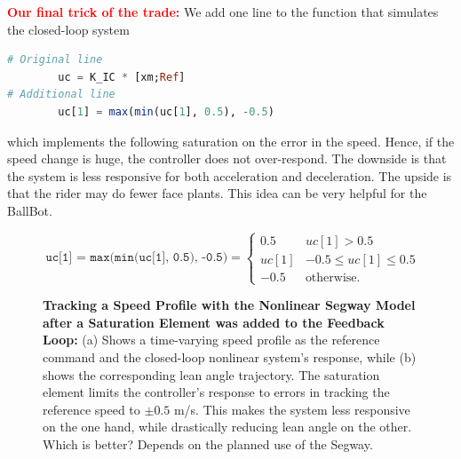 \bigskip
\textcolor{red}{\bf \Large Our final trick of the trade:} We add one line to the function that simulates the closed-loop system

\begin{lstlisting}[language=Julia,style=mystyle]
# Original line
        uc = K_IC * [xm;Ref]
# Additional line 
        uc[1] = max(min(uc[1], 0.5), -0.5)
\end{lstlisting}
which implements the following saturation on the error in the speed. Hence, if the speed change is huge, the controller does not over-respond. The downside is that the system is less responsive for both acceleration and deceleration. The upside is that the rider may do fewer face plants. This idea can be very helpful for the BallBot. 

$$
\texttt{ uc[1] = max(min(uc[1], 0.5), -0.5)}=\begin{cases}
0.5 & uc[1] > 0.5 \\
uc[1] & -0.5 \le uc [1] \le 0.5\\
-0.5 & \text{otherwise}.    
\end{cases}
$$

\begin{figure}[htb]%
\centering
{}%
\hfill%
%
\hfill%
    \caption[]{\textbf{Tracking a Speed Profile with the Nonlinear Segway Model after a Saturation Element was added to the Feedback Loop:} (a) Shows a time-varying speed profile as the reference command and the closed-loop nonlinear system's response, while (b) shows the corresponding lean angle trajectory. The saturation element limits the controller's response to errors in tracking the reference speed to $\pm 0.5$ m/s. This makes the system less responsive on the one hand, while drastically reducing lean angle on the other. Which is better? Depends on the planned use of the Segway.}
    \label{fig:SegwaySpeedProfileLeanAngleNonlinearWithSaturationModel}
\end{figure}



